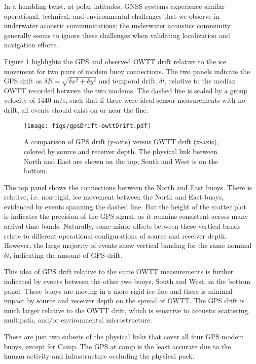 In a humbling twist, at polar latitudes, GNSS systems experience similar operational, technical, and environmental challenges that we observe in underwater acoustic communications; the underwater acoustics community generally seems to ignore these challenges when validating localization and navigation efforts.

Figure \ref{fig:gps-drift-example} highlights the GPS and observed OWTT drift relative to the ice movement for two pairs of modem buoy connections.
The two panels indicate the GPS drift as $\delta R = \sqrt{\delta x^2 + \delta y^2}$ and temporal drift, $\delta t$, relative to the median OWTT recorded between the two modems.
The dashed line is scaled by a group velocity of 1440 m/s, such that if there were ideal sensor measurements with no drift, all events should exist on or near the line.

\begin{figure}[h!]
	\centering
	\texttt{[image: figs/gpsDrift-owttDrift.pdf]} 
	\caption{A comparison of GPS drift (y-axis) versus OWTT drift (x-axis), colored by source and receiver depth. The physical link between North and East are shown on the top; South and West is on the bottom.}
	\label{fig:gps-drift-example}
\end{figure}

The top panel shows the connections between the North and East buoys.
There is relative, i.e. non-rigid, ice movement between the North and East buoys, evidenced by events spanning the dashed line.
But the height of the scatter plot is indicates the precision of the GPS signal, as it remains consistent across many arrival time bands.
Naturally, some minor offsets between these vertical bands relate to different operational configurations of source and receiver depth.
However, the large majority of events show vertical banding for the same nominal $\delta t$, indicating the amount of GPS drift.

This idea of GPS drift relative to the same OWTT measurements is further indicated by events between the other two buoys, South and West, in the bottom panel.
These buoys are moving in a more rigid ice floe and there is minimal impact by source and receiver depth on the spread of OWTT.
The GPS drift is much larger relative to the OWTT drift, which is sensitive to acoustic scattering, multipath, and/or environmental microstructure.

These are just two subsets of the physical links that cover all four GPS modem buoys, except for Camp.
The GPS at camp is the least accurate due to the human activity and infrastructure occluding the physical puck.

